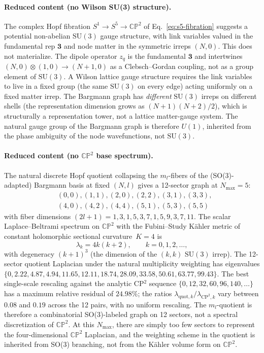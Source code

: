 \documentclass[twocolumn,pra,amsmath,amssymb,superscriptaddress]{revtex4-2}
\begin{document}
\paragraph{Reduced content (no Wilson SU(3) structure).}
The complex Hopf fibration $S^1\to S^5\to\mathbb{CP}^2$ of
Eq.~\eqref{eq:s5-fibration} suggests a potential non-abelian
$\mathrm{SU}(3)$ gauge structure, with link variables valued in the
fundamental rep $\mathbf{3}$ and node matter in the symmetric
irreps $(N, 0)$.  This does not materialize.  The dipole operator
$z_q$ is the fundamental $\mathbf{3}$ and intertwines
$(N, 0)\otimes(1, 0)\to(N+1, 0)$ as a Clebsch--Gordan coupling, not
as a group element of $\mathrm{SU}(3)$.  A Wilson lattice gauge
structure requires the link variables to live in a fixed group
(the same $\mathrm{SU}(3)$ on every edge) acting uniformly on a
fixed matter irrep.  The Bargmann graph has \emph{different}
$\mathrm{SU}(3)$ irreps on different shells (the representation
dimension grows as $(N+1)(N+2)/2$), which is structurally a
representation tower, not a lattice matter-gauge system.  The
natural gauge group of the Bargmann graph is therefore $U(1)$,
inherited from the phase ambiguity of the node wavefunctions,
not $\mathrm{SU}(3)$.

\paragraph{Reduced content (no $\mathbb{CP}^2$ base spectrum).}
The natural discrete Hopf quotient collapsing the $m_l$-fibers of
the (SO(3)-adapted) Bargmann basis at fixed $(N, l)$ gives a
12-sector graph at $N_{\max} = 5$:
\[
\begin{aligned}
& (0,0), (1,1), (2,0), (2,2), (3,1), (3,3), \\
& (4,0), (4,2), (4,4), (5,1), (5,3), (5,5)
\end{aligned}
\]
with fiber dimensions $(2l+1) = 1, 3, 1, 5, 3, 7, 1, 5, 9, 3, 7, 11$.
The scalar Laplace--Beltrami spectrum on $\mathbb{CP}^2$ with the
Fubini--Study K\"ahler metric of constant holomorphic sectional
curvature~$K = 4$ is~\cite{berger_gauduchon_mazet}
\begin{equation}
  \lambda_k = 4k(k+2),\qquad k = 0, 1, 2, \ldots,
\end{equation}
with degeneracy $(k+1)^3$ (the dimension of the $(k, k)$
$\mathrm{SU}(3)$ irrep).  The 12-sector quotient Laplacian under
the natural multiplicity weighting has eigenvalues
$\{0, 2.22, 4.87, 4.94, 11.65, 12.11, 18.74, 28.09, 33.58, 50.61,
63.77, 99.43\}$.  The best single-scale rescaling against the
analytic CP$^2$ sequence $\{0, 12, 32, 60, 96, 140, \ldots\}$ has
a maximum relative residual of $24.98\%$; the ratios
$\lambda_{\mathrm{quot},k}/\lambda_{\mathrm{CP}^2,k}$ vary between
$0.08$ and $0.19$ across the 12 pairs, with no uniform rescaling.
The $m_l$-quotient is therefore a combinatorial SO(3)-labeled graph
on 12 sectors, not a spectral discretization of $\mathbb{CP}^2$.
At this $N_{\max}$, there are simply too few sectors to represent
the four-dimensional $\mathbb{CP}^2$ Laplacian, and the weighting
scheme in the quotient is inherited from SO(3) branching, not from
the K\"ahler volume form on $\mathbb{CP}^2$.
\end{document}
